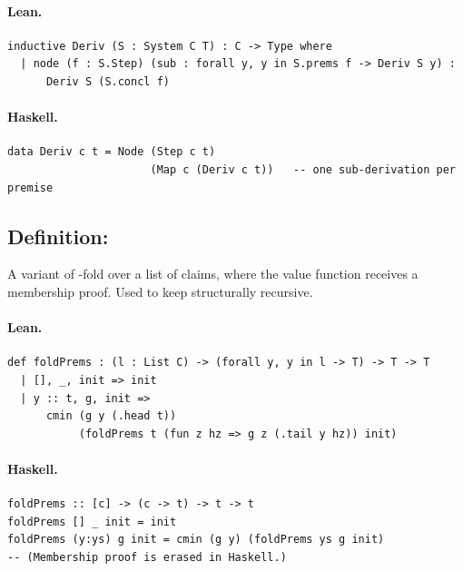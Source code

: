 \documentclass[11pt,a4paper]{article}
\begin{document}
\paragraph{Lean.}
\begin{lstlisting}[style=lean]
inductive Deriv (S : System C T) : C -> Type where
  | node (f : S.Step) (sub : forall y, y in S.prems f -> Deriv S y) :
      Deriv S (S.concl f)
\end{lstlisting}

\paragraph{Haskell.}
\begin{lstlisting}[style=haskell]
data Deriv c t = Node (Step c t)
                      (Map c (Deriv c t))   -- one sub-derivation per premise
\end{lstlisting}


\subsection{Definition: }

\begin{defn}
A variant of -fold over a list of claims, where the value function
receives a membership proof.  Used to keep  structurally
recursive.
\end{defn}

\paragraph{Lean.}
\begin{lstlisting}[style=lean]
def foldPrems : (l : List C) -> (forall y, y in l -> T) -> T -> T
  | [], _, init => init
  | y :: t, g, init =>
      cmin (g y (.head t))
           (foldPrems t (fun z hz => g z (.tail y hz)) init)
\end{lstlisting}

\paragraph{Haskell.}
\begin{lstlisting}[style=haskell]
foldPrems :: [c] -> (c -> t) -> t -> t
foldPrems [] _ init = init
foldPrems (y:ys) g init = cmin (g y) (foldPrems ys g init)
-- (Membership proof is erased in Haskell.)
\end{lstlisting}
\end{document}
